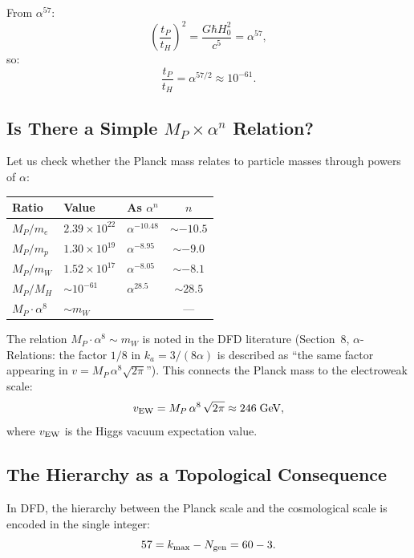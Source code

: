 \documentclass[11pt,a4paper]{article}
\begin{document}
From $\alpha^{57}$:
\begin{equation}
\left(\frac{t_P}{t_H}\right)^2 = \frac{G\hbar H_0^2}{c^5} = \alpha^{57},
\end{equation}
so:
\begin{equation}
\boxed{\frac{t_P}{t_H} = \alpha^{57/2} \approx 10^{-61}.}
\end{equation}

\subsection{Is There a Simple $M_P \times \alpha^n$ Relation?}

Let us check whether the Planck mass relates to particle masses through powers of $\alpha$:

\begin{center}
\renewcommand{\arraystretch}{1.2}
\begin{tabular}{lllc}
\toprule
\textbf{Ratio} & \textbf{Value} & \textbf{As $\alpha^n$} & \textbf{$n$} \\
\midrule
$M_P/m_e$ & $2.39 \times 10^{22}$ & $\alpha^{-10.48}$ & $\sim -10.5$ \\
$M_P/m_p$ & $1.30 \times 10^{19}$ & $\alpha^{-8.95}$ & $\sim -9.0$ \\
$M_P/m_W$ & $1.52 \times 10^{17}$ & $\alpha^{-8.05}$ & $\sim -8.1$ \\
$M_P/M_H$ & $\sim 10^{-61}$ & $\alpha^{28.5}$ & $\sim 28.5$ \\
$M_P \cdot \alpha^8$ & $\sim m_W$ & & --- \\
\bottomrule
\end{tabular}
\end{center}

The relation $M_P \cdot \alpha^8 \sim m_W$ is noted in the DFD literature (Section~8, $\alpha$-Relations: the factor $1/8$ in $k_a = 3/(8\alpha)$ is described as ``the same factor appearing in $v = M_P\,\alpha^8\sqrt{2\pi}$''). This connects the Planck mass to the electroweak scale:
\begin{equation}
v_{\rm EW} = M_P\,\alpha^8\,\sqrt{2\pi} \approx 246\;\text{GeV},
\end{equation}
where $v_{\rm EW}$ is the Higgs vacuum expectation value.

\subsection{The Hierarchy as a Topological Consequence}

In DFD, the hierarchy between the Planck scale and the cosmological scale is encoded in the single integer:
\begin{equation}
57 = k_{\max} - N_{\rm gen} = 60 - 3.
\end{equation}
\end{document}
